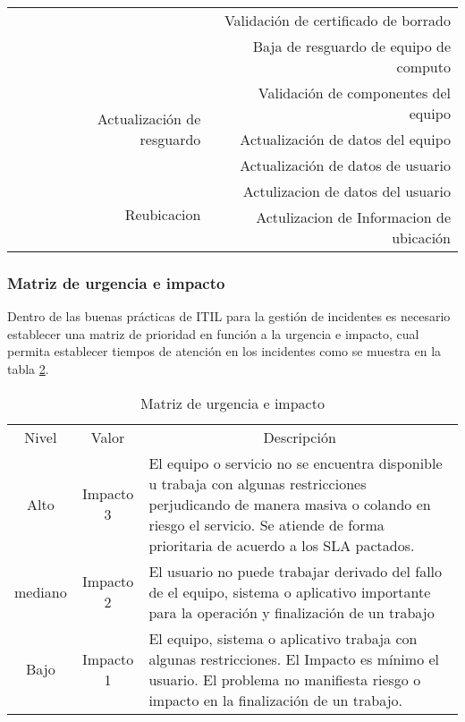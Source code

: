 \begin{table}[h!]
{\begin{tabular}{|c|c|r|r|}
		\cmidrule{4-4}        &   &   & Validación de certificado de borrado  \\
		\cmidrule{4-4}        &   &   & Baja de resguardo de equipo de computo  \\
		\cmidrule{3-4}        &   & \multicolumn{1}{r|}{\multirow{3}[6]{*}{Actualización de resguardo }} & Validación de componentes del equipo   \\
		\cmidrule{4-4}        &   &   & Actualización de datos del equipo  \\
		\cmidrule{4-4}        &   &   & Actualización de datos de usuario  \\
		\cmidrule{3-4}        &   & \multicolumn{1}{r|}{\multirow{2}[4]{*}{Reubicacion }} & Actulizacion de datos del usuario  \\
		\cmidrule{4-4}        &   &   & Actulizacion de Informacion de ubicación  \\
		\bottomrule
	\end{tabular}%
	\label{tab:REAADM}}%
\end{table}%



\subsubsection{Matriz de urgencia e impacto}

Dentro de las buenas prácticas de ITIL para la gestión de incidentes es necesario establecer una matriz de prioridad en función a la urgencia e impacto, cual  permita establecer tiempos de atención en los incidentes como se muestra en la tabla \ref{tab:MATURG}.
\begin{table}[H]
	\centering
	\caption{Matriz de urgencia e impacto}
	\begin{tabular}{|c|c|p{31.145em}|}
		\toprule
		\rowcolor[rgb]{ .267,  .447,  .769} \multicolumn{3}{|c|}{\textcolor[rgb]{ 1,  1,  1}{Definición de impacto}} \\
		\midrule
		\rowcolor[rgb]{ .267,  .447,  .769} \textcolor[rgb]{ 1,  1,  1}{Nivel} & \textcolor[rgb]{ 1,  1,  1}{Valor} & \multicolumn{1}{c|}{\textcolor[rgb]{ 1,  1,  1}{Descripción}} \\
		\midrule
		Alto & Impacto 3 & El equipo o servicio no se encuentra disponible u trabaja con algunas restricciones perjudicando de manera masiva o colando en riesgo el servicio. Se atiende de forma prioritaria de acuerdo a los SLA pactados. \\
		\midrule
		mediano & Impacto 2 & El usuario no puede trabajar derivado del fallo de el equipo, sistema o aplicativo importante para la operación y finalización de un trabajo \\
		\midrule
		Bajo & Impacto 1 & El equipo, sistema o aplicativo trabaja con algunas restricciones. El Impacto es mínimo el usuario. El problema no manifiesta riesgo o impacto en la finalización de un trabajo. \\
		\bottomrule
	\end{tabular}%
	\label{tab:MATURG}%
\end{table}%



